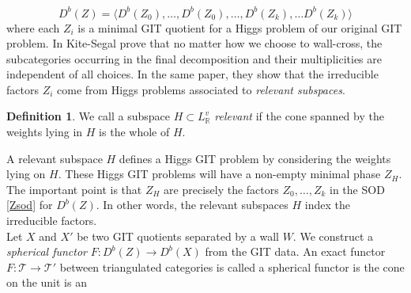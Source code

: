 \documentclass[oneside]{amsart}
\theoremstyle{definition}
\newtheorem{definition}{Definition}[section]
\theoremstyle{definition}
\theoremstyle{definition}
\theoremstyle{definition}
\begin{document}
\begin{equation}
    \label{Zsod}
    D^b(Z) = \langle D^b(Z_0), \dots, D^b(Z_0), \dots, D^b(Z_k), \dots D^b(Z_k)\rangle
\end{equation}
where each $Z_i$ is a minimal GIT quotient for a Higgs problem of our original GIT problem. In \cite{kite2022discriminants} Kite-Segal prove that no matter how we choose to wall-cross, the subcategories occurring in the final decomposition and their multiplicities are independent of all choices. In the same paper, they show that the irreducible factors $Z_i$ come from Higgs problems associated to \textit{relevant subspaces}.
\begin{definition}
    We call a subspace $H \subset L_{\mathbb{R}}^v$ \textit{relevant} if the cone spanned by the weights lying in $H$ is the whole of $H$.
\end{definition}
A relevant subspace $H$ defines a Higgs GIT problem by considering the weights lying on $H$. These Higgs GIT problems will have a non-empty minimal phase $Z_H$. The important point is that $Z_H$ are precisely the factors $Z_0, \dots, Z_k$ in the SOD \eqref{Zsod} for $D^b(Z)$. In other words, the relevant subspaces $H$ index the irreducible factors.  \\
\newline
Let $X$ and $X'$ be two GIT quotients separated by a wall $W$. We construct a \textit{spherical functor} $F : D^b(Z) \to D^b(X) $ from the GIT data. An exact functor $F : \mathcal{T} \to \mathcal{T}'$ between triangulated categories is called a spherical functor is the cone on the unit is an   
\end{document}

